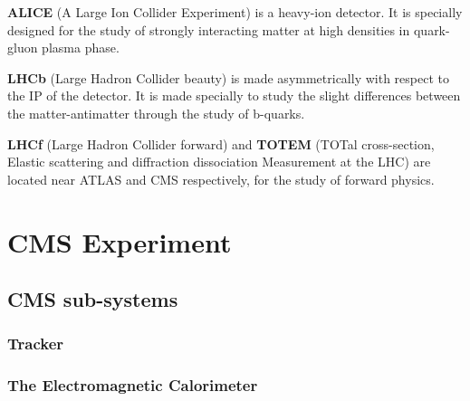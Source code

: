 {\bf ALICE} (A Large Ion Collider Experiment) is a heavy-ion detector. It is specially designed for the study of strongly interacting matter at high densities in quark-gluon plasma phase.

{\bf LHCb} (Large Hadron Collider beauty) is made asymmetrically with respect to the IP of the detector. It is made specially to study the slight differences between the matter-antimatter through the study of b-quarks.

{\bf LHCf} (Large Hadron Collider forward) and {\bf TOTEM} (TOTal cross-section, Elastic scattering and diffraction dissociation Measurement at the LHC) are located near ATLAS and CMS respectively, for the study of forward physics.

\section{CMS Experiment} %
\label{sec:cms_experiment}



\subsection{CMS sub-systems} %
\label{sub:cms_sub_systems}


\subsubsection{Tracker} %
\label{ssub:tracker}

\subsubsection{The Electromagnetic Calorimeter} %
\label{sub:the_electromagnetic_calorimeter}

